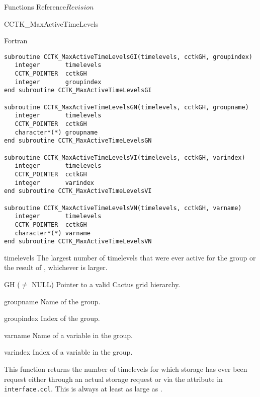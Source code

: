 \begin{cactuspart}{ Functions Reference}{}{$Revision$}
\begin{FunctionDescription}{CCTK\_MaxActiveTimeLevels}
\begin{SynopsisSection}
\begin{Synopsis}{Fortran}
\begin{verbatim}
subroutine CCTK_MaxActiveTimeLevelsGI(timelevels, cctkGH, groupindex)
   integer       timelevels
   CCTK_POINTER  cctkGH
   integer       groupindex
end subroutine CCTK_MaxActiveTimeLevelsGI

subroutine CCTK_MaxActiveTimeLevelsGN(timelevels, cctkGH, groupname)
   integer       timelevels
   CCTK_POINTER  cctkGH
   character*(*) groupname
end subroutine CCTK_MaxActiveTimeLevelsGN

subroutine CCTK_MaxActiveTimeLevelsVI(timelevels, cctkGH, varindex)
   integer       timelevels
   CCTK_POINTER  cctkGH
   integer       varindex
end subroutine CCTK_MaxActiveTimeLevelsVI

subroutine CCTK_MaxActiveTimeLevelsVN(timelevels, cctkGH, varname)
   integer       timelevels
   CCTK_POINTER  cctkGH
   character*(*) varname
end subroutine CCTK_MaxActiveTimeLevelsVN
\end{verbatim}
\end{Synopsis}
\end{SynopsisSection}

\begin{ResultSection}
\begin{Result}{timelevels}
The largest number of timelevels that were ever active for the group or the
result of , whichever is larger.
\end{Result}
\end{ResultSection}

\begin{ParameterSection}
\begin{Parameter}{GH ($\ne$ NULL)}
Pointer to a valid Cactus grid hierarchy.
\end{Parameter}
\begin{Parameter}{groupname}
Name of the group.
\end{Parameter}
\begin{Parameter}{groupindex}
Index of the group.
\end{Parameter}
\begin{Parameter}{varname}
Name of a variable in the group.
\end{Parameter}
\begin{Parameter}{varindex}
Index of a variable in the group.
\end{Parameter}
\end{ParameterSection}

\begin{Discussion}
This function returns the number of timelevels for which storage has
ever been request either through an actual storage request or via the
 attribute in \texttt{interface.ccl}. This is always
at least as large as .
\end{Discussion}


\end{FunctionDescription}
\end{cactuspart}
